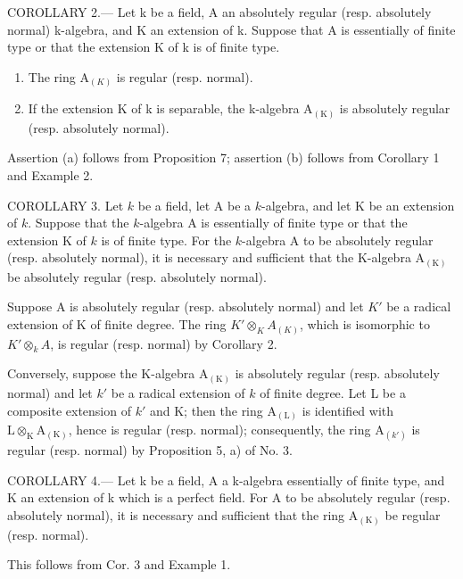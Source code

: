 COROLLARY 2.--- Let k be a field, A an absolutely regular (resp. absolutely normal) k-algebra, and K an extension of k. Suppose that A is essentially of finite type or that the extension K of k is of finite type.

\begin{enumerate}
\def\labelenumi{\alph{enumi})}
\item
  The ring \(\mathrm{A}_{(K)}\) is regular (resp. normal).
\item
  If the extension K of k is separable, the k-algebra \(\mathrm{A}_{(\mathrm{K})}\) is absolutely regular (resp. absolutely normal).
\end{enumerate}

Assertion (a) follows from Proposition 7; assertion (b) follows from Corollary 1 and Example 2.

COROLLARY 3. Let \(k\) be a field, let A be a \(k\)-algebra, and let K be an extension of \(k\). Suppose that the \(k\)-algebra A is essentially of finite type or that the extension K of \(k\) is of finite type. For the \(k\)-algebra A to be absolutely regular (resp. absolutely normal), it is necessary and sufficient that the K-algebra \(\mathrm{A}_{(\mathrm{K})}\) be absolutely regular (resp. absolutely normal).

Suppose A is absolutely regular (resp. absolutely normal) and let \(K'\) be a radical extension of K of finite degree. The ring \(K'\otimes_{K}A_{(K)}\), which is isomorphic to \(K'\otimes_{k}A\), is regular (resp. normal) by Corollary 2.

Conversely, suppose the K-algebra \(\mathrm{A}_{(\mathrm{K})}\) is absolutely regular (resp. absolutely normal) and let \(k'\) be a radical extension of \(k\) of finite degree. Let L be a composite extension of \(k'\) and K; then the ring \(\mathrm{A}_{(\mathrm{L})}\) is identified with \(\mathrm{L} \otimes_{\mathrm{K}} \mathrm{A}_{(\mathrm{K})}\), hence is regular (resp. normal); consequently, the ring \(\mathrm{A}_{(k')}\) is regular (resp. normal) by Proposition 5, a) of No. 3.

COROLLARY 4.--- Let k be a field, A a k-algebra essentially of finite type, and K an extension of k which is a perfect field. For A to be absolutely regular (resp. absolutely normal), it is necessary and sufficient that the ring \(\mathrm{A}_{(\mathrm{K})}\) be regular (resp. normal).

This follows from Cor. 3 and Example 1.

